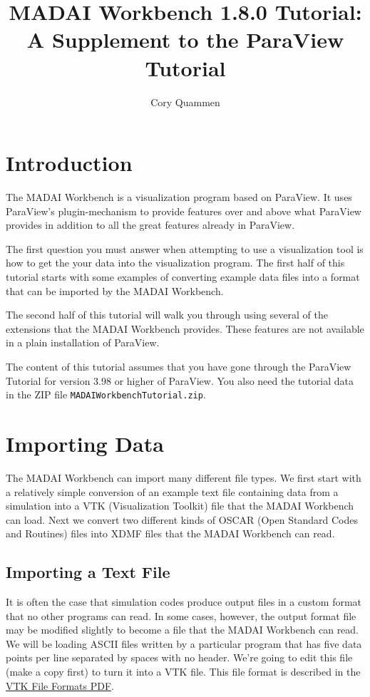 \documentclass[12pt]{article}
\title{MADAI Workbench 1.8.0 Tutorial: \\A Supplement to the ParaView Tutorial}
\author{Cory Quammen}
\date{} %
\newcommand{\file}[1]{\texttt{#1}}
\begin{document}
\maketitle
\tableofcontents

\section{Introduction}

The MADAI Workbench is a visualization program based on ParaView. It uses ParaView's plugin-mechanism to provide features over and above what ParaView provides in addition to all the great features already in ParaView.

The first question you must answer when attempting to use a visualization tool is how to get the your data into the visualization program. The first half of this tutorial starts with some examples of converting example data files into a format that can be imported by the MADAI Workbench. 

The second half of this tutorial will walk you through using several of the extensions that the MADAI Workbench provides. These features are not available in a plain installation of ParaView.

The content of this tutorial assumes that you have gone through the ParaView Tutorial for version 3.98 or higher of ParaView. You also need the tutorial data in the ZIP file \file{MADAIWorkbenchTutorial.zip}.

\section{Importing Data}

The MADAI Workbench can import many different file types. We first start with a relatively simple conversion of an example text file containing data from a simulation into a VTK (Visualization Toolkit) file that the MADAI Workbench can load. Next we convert two different kinds of OSCAR (Open Standard Codes and Routines) files into XDMF files that the MADAI Workbench can read.

\subsection{Importing a Text File}

It is often the case that simulation codes produce output files in a custom format that no other programs can read. In some cases, however, the output format file may be modified slightly to become a file that the MADAI Workbench can read. We will be loading ASCII files written by a particular program that has five data points per line separated by spaces with no header. We’re going to edit this file (make a copy first) to turn it into a VTK file. This file format is described in the \href{http://www.vtk.org/VTK/img/file-formats.pdf}{VTK File Formats PDF}.
\end{document}
